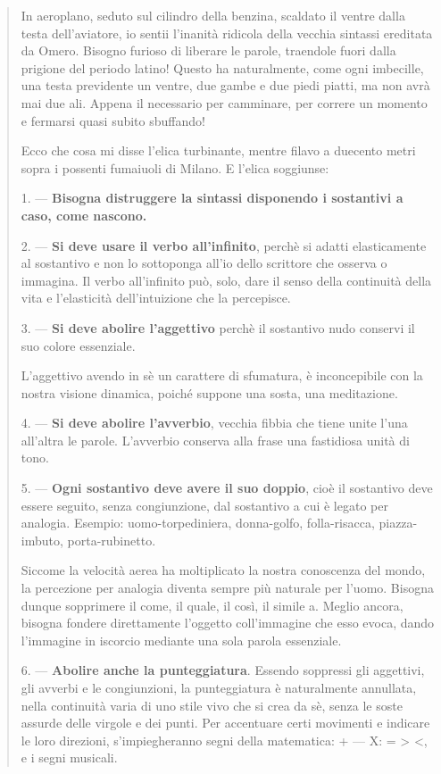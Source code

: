 \documentclass[a4paper, twoside, titlepage]{book}
\newcounter{mar}
\newcommand{\citazione}[1]{%
  \begin{quotation}
  \begin{linenumbers}
  \modulolinenumbers[5]
  \begingroup
  \setlength{\parindent}{0cm}
  \noindent #1
  \endgroup
  \end{linenumbers}
  \end{quotation}\setcounter{linenumber}{1}
  }
\begin{document}
\citazione{
In aeroplano, seduto sul cilindro della benzina, scaldato il ventre dalla testa dell’aviatore, io sentii l’inanità ridicola della vecchia sintassi ereditata da Omero. Bisogno furioso di liberare le parole, traendole fuori dalla prigione del periodo latino! Questo ha naturalmente, come ogni imbecille, una testa previdente un ventre, due gambe e due piedi piatti, ma non avrà mai due ali. Appena il necessario per camminare, per correre un momento e fermarsi quasi subito sbuffando!

Ecco che cosa mi disse l’elica turbinante, mentre filavo a duecento metri sopra i possenti fumaiuoli di Milano. E l’elica soggiunse:

1. — \textbf{Bisogna distruggere la sintassi disponendo i sostantivi a caso, come nascono.}

2. — \textbf{Si deve usare il verbo all’infinito}, perchè si adatti elasticamente al sostantivo e non lo sottoponga all’io dello scrittore che osserva o immagina. Il verbo all’infinito può, solo, dare il senso della continuità della vita e l’elasticità dell’intuizione che la percepisce.

3. — \textbf{Si deve abolire l’aggettivo} perchè il sostantivo nudo conservi il suo colore essenziale.

L’aggettivo avendo in sè un carattere di sfumatura, è inconcepibile con la nostra visione dinamica, poiché suppone una sosta, una meditazione.

4. — \textbf{Si deve abolire l’avverbio}, vecchia fibbia che tiene unite l’una all’altra le parole. L’avverbio conserva alla frase una fastidiosa unità di tono.

5. — \textbf{Ogni sostantivo deve avere il suo doppio}, cioè il sostantivo deve essere seguito, senza congiunzione, dal sostantivo a cui è legato per analogia. Esempio: uomo-torpediniera, donna-golfo, folla-risacca, piazza-imbuto, porta-rubinetto.

Siccome la velocità aerea ha moltiplicato la nostra conoscenza del mondo, la percezione per analogia diventa sempre più naturale per l’uomo. Bisogna dunque sopprimere il come, il quale, il così, il simile a. Meglio ancora, bisogna fondere direttamente l’oggetto coll’immagine che esso evoca, dando l’immagine in iscorcio mediante una sola parola essenziale.

6. — \textbf{Abolire anche la punteggiatura}. Essendo soppressi gli aggettivi, gli avverbi e le congiunzioni, la punteggiatura è naturalmente annullata, nella continuità varia di uno stile vivo che si crea da sè, senza le soste assurde delle virgole e dei punti. Per accentuare certi movimenti e indicare le loro direzioni, s’impiegheranno segni della matematica: + — X: = > <, e i segni musicali.

}
\end{document}
